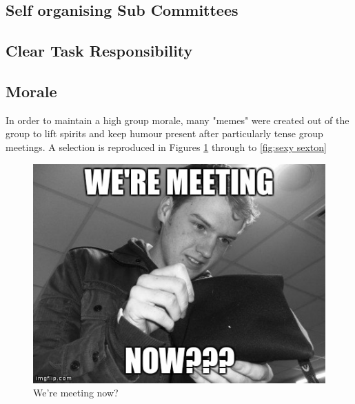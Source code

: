 \subsection{Self organising Sub Committees}

\subsection{Clear Task Responsibility}

\subsection{Morale}
\label{morale}
In order to maintain a high group morale, many "memes" were created out of the group to lift spirits and keep humour present after particularly tense group meetings. A selection is reproduced in Figures \ref{fig:we're meeting now?} through to \ref{fig:sexy sexton}

\begin{figure}[h]
\begin{center}
\includegraphics[scale=0.4]{./design/nathan} 
\end{center}
\caption{We're meeting now?}
\label{fig:we're meeting now?}
\end{figure} 

